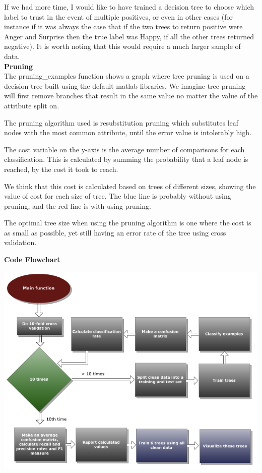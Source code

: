 \documentclass[12pt]{article}
\begin{document}
If we had more time, I would like to have trained a decision tree to choose which label to trust in the event of multiple positives, or even in other cases (for instance if it was always the case that if the two trees to return positive were Anger and Surprise then the true label was Happy, if all the other trees returned negative). It is worth noting that this would require a much larger sample of data. \\

{\bf Pruning} \\
The pruning_examples function shows a graph where tree pruning is used on a decision tree built using the default matlab libraries. We imagine tree pruning will first remove branches that result in the same value no matter the value of the attribute split on.

The pruning algorithm used is resubstitution pruning which substitutes leaf nodes with the most common attribute, until the error value is intolerably high.

The cost variable on the y-axis is the average number of comparisons for each classification. This is calculated by summing the probability that a leaf node is reached, by the cost it took to reach.

We think that this cost is calculated based on trees of different sizes, showing the value of cost for each size of tree. The blue line is probably without using pruning, and the red line is with using pruning.

The optimal tree size when using the pruning algorithm is one where the cost is as small as possible, yet still having an error rate of the tree using cross validation. \\


\newpage

{\bf Code Flowchart} \\
\begin{center}
  \includegraphics[scale=0.6]{report-images/flowchart.png}
\end{center}
\end{document}
